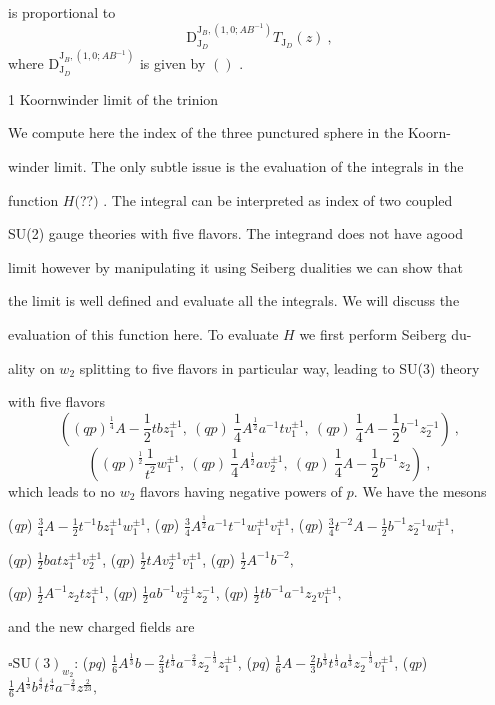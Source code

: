 \documentclass[a4paper,12pt]{article}
\begin{document}
is proportional to
$$
\mathrm{D}_{\mathrm{J}_{D}}^{\mathrm{J}_{B},(1,0;AB^{-1})}T_{\mathrm{J}_{D}}(z)\ ,
$$
where $\mathrm{D}_{\mathrm{J}_{D}}^{\mathrm{J}_{B},(1,0;AB^{-1})}$ is given by $()$ .

1 Koornwinder limit of the trinion

We compute here the index of the three punctured sphere in the Koorn-

winder limit. The only subtle issue is the evaluation of the integrals in the

function $H ($??$)$ . The integral can be interpreted as index of two coupled

SU(2) gauge theories with five flavors. The integrand does not have agood

limit however by manipulating it using Seiberg dualities we can show that

the limit is well defined and evaluate all the integrals. We will discuss the

evaluation of this function here. To evaluate $H$ we first perform Seiberg du-

ality on $w_{2}$ splitting to five flavors in particular way, leading to SU(3) theory

with five flavors
$$
((qp)^{\frac{1}{4}}A-\frac{1}{2}tbz_{1}^{\pm 1},\ (qp)\ \frac{1}{4}A^{\frac{1}{2}}a^{-1}tv_{1}^{\pm 1},\ (qp)\ \frac{1}{4}A-\frac{1}{2}b^{-1}z_{2}^{-1})\ ,
$$
$$
((qp)^{\frac{1}{2}}\frac{1}{t^{2}}w_{1}^{\pm 1},\ (qp)\ \frac{1}{4}A^{\frac{1}{2}}av_{2}^{\pm 1},\ (qp)\ \frac{1}{4}A-\frac{1}{2}b^{-1}z_{2})\ ,
$$
which leads to no $w_{2}$ flavors having negative powers of $p$. We have the mesons

({\it qp}) $\displaystyle \frac{3}{4}A-\frac{1}{2}t^{-1}bz_{1}^{\pm 1}w_{1}^{\pm 1}$, ({\it qp}) $\displaystyle \frac{3}{4}A^{\frac{1}{2}}a^{-1}t^{-1}w_{1}^{\pm 1}v_{1}^{\pm 1}$, ({\it qp}) $\displaystyle \frac{3}{4}t^{-2}A-\frac{1}{2}b^{-1}z_{2}^{-1}w_{1}^{\pm 1},$
\begin{center}
($qp$) $\displaystyle \frac{1}{2}batz_{1}^{\pm 1}v_{2}^{\pm 1}$, ($qp$) $\displaystyle \frac{1}{2}tAv_{2}^{\pm 1}v_{1}^{\pm 1}$, ($qp$) $\displaystyle \frac{1}{2}A^{-1}b^{-2},$

($qp$) $\displaystyle \frac{1}{2}A^{-1}z_{2}tz_{1}^{\pm 1}$, ($qp$) $\displaystyle \frac{1}{2}ab^{-1}v_{2}^{\pm 1}z_{2}^{-1}$, ($qp$) $\displaystyle \frac{1}{2}tb^{-1}a^{-1}z_{2}v_{1}^{\pm 1},$
\end{center}
and the new charged fields are

$\square  \mathrm{S}\mathrm{U}(3)_{w_{2}}$: ({\it pq}) $\displaystyle \frac{1}{6}A^{\frac{1}{3}}b-\frac{2}{3}t^{\frac{1}{3}}a^{-\frac{2}{3}}z_{2}^{-\frac{1}{3}}z_{1}^{\pm 1}$, ({\it pq}) $\displaystyle \frac{1}{6}A-\frac{2}{3}b^{\frac{1}{3}}t^{\frac{1}{3}}a^{\frac{1}{3}}z_{2}^{-\frac{1}{3}}v_{1}^{\pm 1}$, ({\it qp}) $\displaystyle \frac{1}{6}A^{\frac{1}{3}}b^{\frac{4}{3}}t^{\frac{4}{3}}a^{-\frac{2}{3}}z^{\frac{2}{23}},$
\end{document}
